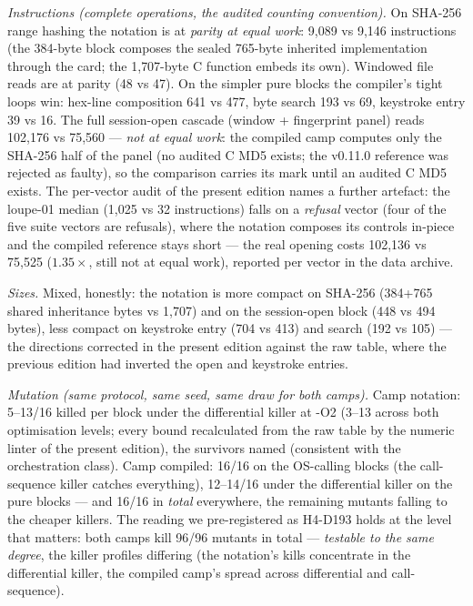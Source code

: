 \documentclass[10pt,a4paper]{article}
\begin{document}
\emph{Instructions (complete operations, the audited counting convention).}
On SHA-256 range hashing the notation is at \emph{parity at equal work}:
9{,}089 vs 9{,}146 instructions (the 384-byte block composes the sealed
765-byte inherited implementation through the card; the 1{,}707-byte C
function embeds its own). Windowed file reads are at parity (48 vs 47). On
the simpler pure blocks the compiler's tight loops win: hex-line
composition 641 vs 477, byte search 193 vs 69, keystroke entry 39 vs 16.
The full session-open cascade (window + fingerprint panel) reads
102{,}176 vs 75{,}560 --- \emph{not at equal work}: the compiled camp
computes only the SHA-256 half of the panel (no audited C MD5 exists;
the v0.11.0 reference was rejected as faulty), so the comparison
carries its mark until an audited C MD5 exists. The per-vector audit
of the present edition names a further artefact: the loupe-01 median
(1{,}025 vs 32 instructions) falls on a \emph{refusal} vector (four
of the five suite vectors are refusals), where the notation composes
its controls in-piece and the compiled reference stays short --- the
real opening costs 102{,}136 vs 75{,}525 ($1.35\times$, still not at
equal work), reported per vector in the data archive.

\emph{Sizes.} Mixed, honestly: the notation is more compact on
SHA-256 (384+765 shared inheritance bytes vs 1{,}707) and on the
session-open block (448 vs 494 bytes), less compact on keystroke
entry (704 vs 413) and search (192 vs 105) --- the directions
corrected in the present edition against the raw table, where the
previous edition had inverted the open and keystroke entries.

\emph{Mutation (same protocol, same seed, same draw for both camps).}
Camp notation: 5--13/16 killed per block under the differential
killer at -O2 (3--13 across both optimisation levels; every bound
recalculated from the raw table by the numeric linter of the present
edition), the survivors named (consistent with the orchestration
class). Camp compiled: 16/16 on the OS-calling blocks (the call-
sequence killer catches everything), 12--14/16 under the differential
killer on the pure blocks --- and 16/16 in \emph{total} everywhere,
the remaining mutants falling to the cheaper killers. The reading we
pre-registered as H4-D193 holds at the level that matters: both camps
kill 96/96 mutants in total --- \emph{testable to the same degree},
the killer profiles differing (the notation's kills concentrate in
the differential killer, the compiled camp's spread across
differential and call-sequence).
\end{document}
